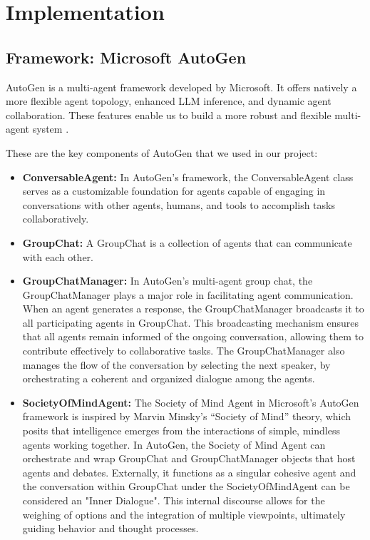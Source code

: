 \section{Implementation}
\label{sec:implementation}

\subsection{Framework: Microsoft AutoGen}
AutoGen is a multi-agent framework developed by Microsoft. It offers natively a more flexible agent topology, enhanced LLM inference, and dynamic agent collaboration. These features enable us to build a more robust and flexible multi-agent system \cite{microsoft_autogen}.

These are the key components of AutoGen that we used in our project:
\begin{itemize}
    \item \textbf{ConversableAgent:} In AutoGen's framework, the ConversableAgent class serves as a customizable foundation for agents capable of engaging in conversations with other agents, humans, and tools to accomplish tasks collaboratively.
    \item \textbf{GroupChat:} A GroupChat is a collection of agents that can communicate with each other.
    \item \textbf{GroupChatManager:} In AutoGen's multi-agent group chat, the GroupChatManager plays a major role in facilitating agent communication. When an agent generates a response, the GroupChatManager broadcasts it to all participating agents in GroupChat. This broadcasting mechanism ensures that all agents remain informed of the ongoing conversation, allowing them to contribute effectively to collaborative tasks. The GroupChatManager also manages the flow of the conversation by selecting the next speaker, by orchestrating a coherent and organized dialogue among the agents.
    \item \textbf{SocietyOfMindAgent:} The Society of Mind Agent in Microsoft's AutoGen framework is inspired by Marvin Minsky's “Society of Mind” theory, which posits that intelligence emerges from the interactions of simple, mindless agents working together. In AutoGen, the Society of Mind Agent can orchestrate and wrap GroupChat and GroupChatManager objects that host agents and debates. Externally, it functions as a singular cohesive agent and the conversation within GroupChat under the SocietyOfMindAgent can be considered an "Inner Dialogue". This internal discourse allows for the weighing of options and the integration of multiple viewpoints, ultimately guiding behavior and thought processes.
\end{itemize}

